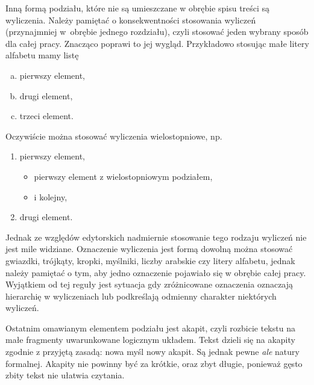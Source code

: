 Inną formą podziału, które nie są umieszczane w obrębie spisu treści są wyliczenia. Należy pamiętać o konsekwentności stosowania wyliczeń (przynajmniej w~obrębie jednego rozdziału), czyli stosować jeden wybrany sposób dla całej pracy. Znacząco poprawi to jej wygląd. Przykładowo stosując małe litery alfabetu mamy listę
\begin{enumerate}[(a)]
	\item pierwszy element,
	\item drugi element,
	\item trzeci element.
\end{enumerate}
Oczywiście można stosować wyliczenia wielostopniowe, np.
\begin{enumerate}
	\item pierwszy element,
		\begin{itemize}
			\item pierwszy element z wielostopniowym podziałem,
			\item i kolejny,
		\end{itemize}
	\item drugi element.
\end{enumerate}
Jednak ze względów edytorskich nadmiernie stosowanie tego rodzaju wyliczeń nie jest mile widziane. Oznaczenie wyliczenia jest formą dowolną \pauza można stosować gwiazdki, trójkąty, kropki, myślniki, liczby arabskie czy litery alfabetu, jednak należy pamiętać o tym, aby jedno oznaczenie pojawiało się w obrębie całej pracy. Wyjątkiem od tej reguły jest sytuacja gdy zróżnicowane oznaczenia oznaczają hierarchię w wyliczeniach lub podkreślają odmienny charakter niektórych wyliczeń.

Ostatnim omawianym elementem podziału jest akapit, czyli rozbicie tekstu na małe fragmenty uwarunkowane logicznym układem. Tekst dzieli się na akapity zgodnie z przyjętą zasadą: nowa myśl \pauza nowy akapit. Są jednak pewne \textit{ale} natury formalnej. Akapity nie powinny być za krótkie, oraz zbyt długie, ponieważ gęsto zbity tekst nie ułatwia czytania. 

